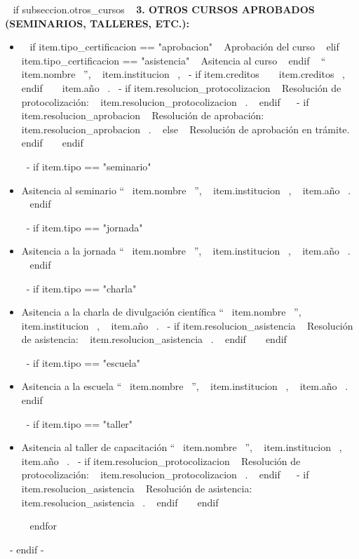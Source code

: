     ~{ if subseccion.otros_cursos }~
      \textbf{3. OTROS CURSOS APROBADOS (SEMINARIOS, TALLERES, ETC.):}
      \begin{itemize}
      ~{ for item in subseccion.otros_cursos }~
        ~{- if item.tipo == "curso" }~
          \item ~{ if item.tipo_certificacion == "aprobacion" }~ Aprobación del curso ~{ elif item.tipo_certificacion == "asistencia" }~ Asitencia al curso ~{ endif }~
                ``~{{ item.nombre }}~'', ~{{ item.institucion }}~,
                ~{- if item.creditos }~ ~{{ item.creditos }}~, ~{ endif }~
                ~{{ item.año }}~.
                ~{- if item.resolucion_protocolizacion }~ Resolución de protocolización: ~{{ item.resolucion_protocolizacion }}~. ~{ endif }~
                ~{- if item.resolucion_aprobacion }~ Resolución de aprobación: ~{{ item.resolucion_aprobacion }}~. ~{ else }~ Resolución de aprobación en trámite. ~{ endif }~
          \espacioEntreItems{}
        ~{ endif }~

        ~{- if item.tipo == "seminario" }~
          \item Asitencia al seminario ``~{{ item.nombre }}~'', ~{{ item.institucion }}~, ~{{ item.año }}~.
          \espacioEntreItems{}
        ~{ endif }~

        ~{- if item.tipo == "jornada" }~
          \item Asitencia a la jornada ``~{{ item.nombre }}~'', ~{{ item.institucion }}~, ~{{ item.año }}~.
          \espacioEntreItems{}
        ~{ endif }~

        ~{- if item.tipo == "charla" }~
          \item Asitencia a la charla de divulgación científica ``~{{ item.nombre }}~'', ~{{ item.institucion }}~, ~{{ item.año }}~.
                ~{- if item.resolucion_asistencia }~ Resolución de asistencia: ~{{ item.resolucion_asistencia }}~. ~{ endif }~
          \espacioEntreItems{}
        ~{ endif }~

        ~{- if item.tipo == "escuela" }~
          \item Asitencia a la escuela ``~{{ item.nombre }}~'', ~{{ item.institucion }}~, ~{{ item.año }}~.
          \espacioEntreItems{}
        ~{ endif }~

        ~{- if item.tipo == "taller" }~
          \item Asitencia al taller de capacitación ``~{{ item.nombre }}~'', ~{{ item.institucion }}~, ~{{ item.año }}~.
                ~{- if item.resolucion_protocolizacion }~ Resolución de protocolización: ~{{ item.resolucion_protocolizacion }}~. ~{ endif }~
                ~{- if item.resolucion_asistencia }~ Resolución de asistencia: ~{{ item.resolucion_asistencia }}~. ~{ endif }~
          \espacioEntreItems{}
        ~{ endif }~

      ~{ endfor }~
      \end{itemize}
      \espacioEntreSubSecciones{}
    ~{- endif -}~

